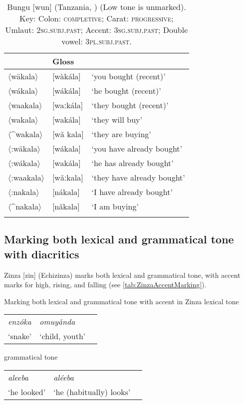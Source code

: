 \documentclass[output=paper]{langscibook}
\begin{document}
\begin{table}
        \begin{tabular}{lll}
        \lsptoprule
\multicolumn{2}{l}{Orthography} & Gloss\\\midrule
        $\langle$w\"{a}kala$\rangle$  & [wàkála] & ‘you bought (recent)’            \\
        $\langle$wákala$\rangle$  & [wákála] & ‘he bought (recent)’                 \\
        $\langle$waakala$\rangle$  & [waːkála] & ‘they bought (recent)’             \\
        $\langle$wakala$\rangle$   & [wakála]   & ‘they will buy’           \\
        $\langle$\^{}wakala$\rangle$  & [wa\v{} kala]   & ‘they are buying’ \\
        $\langle$:w\"{a}kala$\rangle$ & [wákala] & {‘you have already bought’}\\
        $\langle$:wákala$\rangle$  & [wakála]  & {‘he has already bought’}\\
        $\langle$:waakala$\rangle$  & [wǎːkala] & {‘they have already bought’}\\
        $\langle$:nakala$\rangle$  & [nákala] & {‘I have already bought’}\\
        $\langle$\^{}nakala$\rangle$ & [nǎkala]  & {‘I am buying’}\\
\lspbottomrule
        \end{tabular}
        \caption{Bungu [wun] (Tanzania, \citealt{Katterhenrich2016}) \textmd{(Low tone is unmarked)}. Key:  Colon: \textsc{completive}; Carat: \textsc{progressive}; Umlaut: \textsc{2sg.subj.past}; Accent: \textsc{3sg.subj.past}; Double vowel: \textsc{3pl.subj.past}.}
        \label{tab:BunguGrammaticalToneMarking}
    \end{table}

\subsection{Marking both lexical and grammatical tone with diacritics}
\label{sec:HowToneMarked:LexicalGrammatical:4}

Zinza [zin] (Echizinza) marks both lexical and grammatical tone, with accent marks for high, rising, and falling (see \ref{tab:ZinzaAccentMarking}).

\ea Marking both lexical and grammatical tone with accent in Zinza \citep{Matthews2010}\label{tab:ZinzaAccentMarking}
\ea lexical tone\smallskip\\
    \begin{tabularx}{\linewidth}{@{}XXX@{}}
    \textit{enzóka} & \textit{omuyǎnda} & \\
    ‘snake’ &   ‘child, youth’& \\
    \end{tabularx}
\ex grammatical tone\smallskip\\
    \begin{tabularx}{\linewidth}{@{}XXX@{}}
    \textit{aleeba} & \textit{aléeba} & \\
    ‘he looked’ & ‘he (habitually) looks’ & \\
    \end{tabularx}
\z
\z
\end{document}
